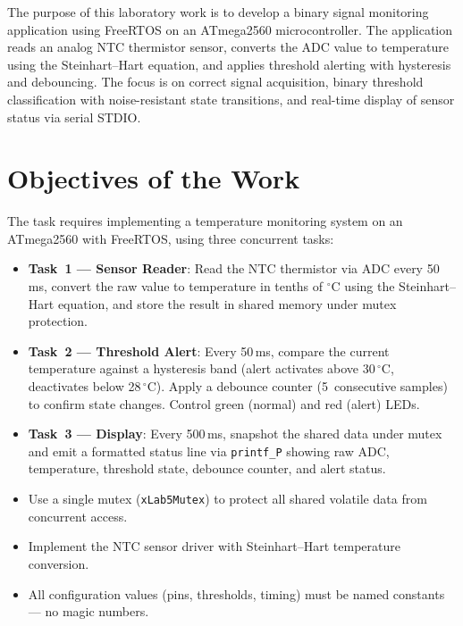 \documentclass[12pt]{article}
\begin{document}
The purpose of this laboratory work is to develop a binary signal monitoring application using FreeRTOS on an ATmega2560 microcontroller. The application reads an analog NTC thermistor sensor, converts the ADC value to temperature using the Steinhart--Hart equation, and applies threshold alerting with hysteresis and debouncing. The focus is on correct signal acquisition, binary threshold classification with noise-resistant state transitions, and real-time display of sensor status via serial STDIO.

\section{Objectives of the Work}

The task requires implementing a temperature monitoring system on an ATmega2560 with FreeRTOS, using three concurrent tasks:
\begin{itemize}
  \item \textbf{Task~1 --- Sensor Reader}: Read the NTC thermistor via ADC every 50\,ms, convert the raw value to temperature in tenths of \(^{\circ}\)C using the Steinhart--Hart equation, and store the result in shared memory under mutex protection.
  \item \textbf{Task~2 --- Threshold Alert}: Every 50\,ms, compare the current temperature against a hysteresis band (alert activates above 30\,\(^{\circ}\)C, deactivates below 28\,\(^{\circ}\)C). Apply a debounce counter (5~consecutive samples) to confirm state changes. Control green (normal) and red (alert) LEDs.
  \item \textbf{Task~3 --- Display}: Every 500\,ms, snapshot the shared data under mutex and emit a formatted status line via \texttt{printf\_P} showing raw ADC, temperature, threshold state, debounce counter, and alert status.
  \item Use a single mutex (\texttt{xLab5Mutex}) to protect all shared volatile data from concurrent access.
  \item Implement the NTC sensor driver with Steinhart--Hart temperature conversion.
  \item All configuration values (pins, thresholds, timing) must be named constants --- no magic numbers.
\end{itemize}

\end{document}

